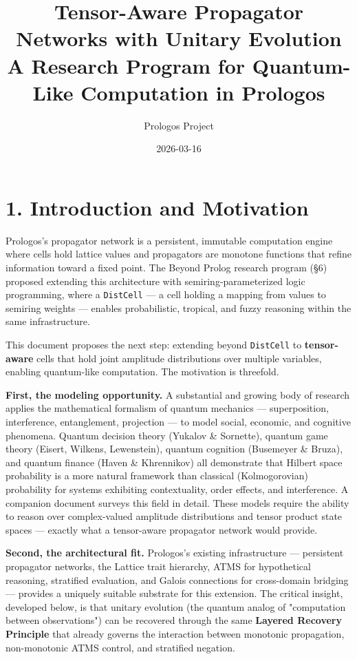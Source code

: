 \documentclass[11pt]{article}
\author{Prologos Project}
\date{2026-03-16}
\title{Tensor-Aware Propagator Networks with Unitary Evolution\\\medskip
\large A Research Program for Quantum-Like Computation in Prologos}
\begin{document}
\maketitle
\tableofcontents

\section{1. Introduction and Motivation}
\label{sec:orgd45c75e}

Prologos's propagator network is a persistent, immutable computation engine where
cells hold lattice values and propagators are monotone functions that refine
information toward a fixed point. The Beyond Prolog research program (§6) proposed
extending this architecture with semiring-parameterized logic programming, where a
\texttt{DistCell} --- a cell holding a mapping from values to semiring weights --- enables
probabilistic, tropical, and fuzzy reasoning within the same infrastructure.

This document proposes the next step: extending beyond \texttt{DistCell} to \textbf{tensor-aware}
cells that hold joint amplitude distributions over multiple variables, enabling
quantum-like computation. The motivation is threefold.

\textbf{First, the modeling opportunity.} A substantial and growing body of research
applies the mathematical formalism of quantum mechanics --- superposition,
interference, entanglement, projection --- to model social, economic, and cognitive
phenomena. Quantum decision theory (Yukalov \& Sornette), quantum game theory
(Eisert, Wilkens, Lewenstein), quantum cognition (Busemeyer \& Bruza), and quantum
finance (Haven \& Khrennikov) all demonstrate that Hilbert space probability is a
more natural framework than classical (Kolmogorovian) probability for systems
exhibiting contextuality, order effects, and interference. A companion document
surveys this field in detail. These models require the ability to reason over
complex-valued amplitude distributions and tensor product state spaces --- exactly
what a tensor-aware propagator network would provide.

\textbf{Second, the architectural fit.} Prologos's existing infrastructure ---
persistent propagator networks, the Lattice trait hierarchy, ATMS for
hypothetical reasoning, stratified evaluation, and Galois connections for
cross-domain bridging --- provides a uniquely suitable substrate for this
extension. The critical insight, developed below, is that unitary evolution
(the quantum analog of "computation between observations") can be recovered
through the same \textbf{Layered Recovery Principle} that already governs the
interaction between monotonic propagation, non-monotonic ATMS control, and
stratified negation.
\end{document}
